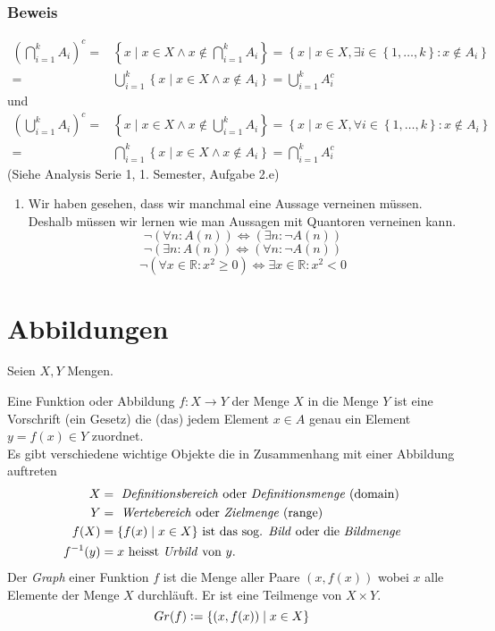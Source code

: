 \subsubsection*{Beweis}
\begin{align*}
{\left( {\bigcap\limits_{i = 1}^k {{A_i}} } \right)^c}
  =&\left\{x \;| \; {x \in X \wedge x\not  \in \bigcap\limits_{i = 1}^k {{A_i}} } \right\} 
  = \left\{ x \;| \; {x \in X, \exists i \in \left\{ {1, \ldots ,k} \right\}:x\not  \in {A_i}} \right\}\\
 =&\bigcup\limits_{i = 1}^k {\left\{ x \;| \; {x \in X \wedge x\not  \in {A_i}} \right\}}   = \bigcup\limits_{i = 1}^k {A_i^c}
\end{align*}
und
\begin{align*}
{\left( {\bigcup\limits_{i = 1}^k {{A_i}} } \right)^c} 
=&\left\{x \;| \; {x \in X \wedge x\not  \in \bigcup\limits_{i = 1}^k {{A_i}} } \right\} 
= \left\{x \;| \; {x \in X, \forall i \in \left\{ {1, \ldots ,k} \right\}:x\not  \in {A_i}} \right\}\\
=&\bigcap\limits_{i = 1}^k {\left\{ {x \;| \;x \in X \wedge x\not  \in {A_i}} \right\}}  
= \bigcap\limits_{i = 1}^k {A_i^c} 
\end{align*}
\noindent (Siehe Analysis Serie 1, 1. Semester, Aufgabe 2.e)
\begin{enumerate}[($\ast$)]
\item Wir haben gesehen, dass wir manchmal eine Aussage verneinen müssen. Deshalb müssen wir lernen wie man Aussagen mit Quantoren verneinen kann.
\[\neg\left(\forall n:A(n)\right)\Leftrightarrow\left(\exists n:\neg A(n)\right)\]
\[\neg\left(\exists n:A(n)\right)\Leftrightarrow\left(\forall n:\neg A(n)\right)\]
\[\neg\left(\forall x\in \mathbb{R}:x^2\geq 0\right)\Leftrightarrow\exists x\in\mathbb{R}:x^2<0\]
\end{enumerate}
\section{Abbildungen}
Seien $X,Y$ Mengen. 

\begin{definition}{1.9}
Eine Funktion oder Abbildung $f:X\to Y$ der Menge $X$ in die Menge $Y$ ist eine Vorschrift (ein Gesetz) die (das) jedem Element $x\in A$ genau ein Element $y=f(x)\in Y$ zuordnet. \\

Es gibt verschiedene wichtige Objekte die in Zusammenhang mit einer Abbildung auftreten 
\begin{align*}
X &= \text{ \emph{Definitionsbereich} oder \emph{Definitionsmenge} (domain)} \\
Y&= \text{ \emph{Wertebereich} oder \emph{Zielmenge} (range)} \\
f(X) &=\{f(x)\mid x\in X\}\text{ ist das sog. \emph{Bild} oder die \emph{Bildmenge}} \\
f^{-1}(y) &= x\text{ heisst \emph{Urbild} von }y. \end{align*}
Der \emph{Graph} einer Funktion $f$ ist die Menge aller Paare $(x, f(x))$ wobei $x$ alle Elemente der Menge $X$ durchläuft. Er ist eine Teilmenge von $X \times Y$.
\[ Gr(f) \vcentcolon= \{ (x, f(x)) \mid x \in X\} \]
\end{definition}

